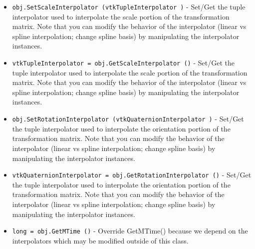\begin{itemize}
\item  \verb|obj.SetScaleInterpolator (vtkTupleInterpolator )| -  Set/Get the tuple interpolator used to interpolate the scale portion
 of the transformation matrix. Note that you can modify the behavior of
 the interpolator (linear vs spline interpolation; change spline basis)
 by manipulating the interpolator instances.

\item  \verb|vtkTupleInterpolator = obj.GetScaleInterpolator ()| -  Set/Get the tuple interpolator used to interpolate the scale portion
 of the transformation matrix. Note that you can modify the behavior of
 the interpolator (linear vs spline interpolation; change spline basis)
 by manipulating the interpolator instances.

\item  \verb|obj.SetRotationInterpolator (vtkQuaternionInterpolator )| -  Set/Get the tuple interpolator used to interpolate the orientation portion
 of the transformation matrix. Note that you can modify the behavior of
 the interpolator (linear vs spline interpolation; change spline basis)
 by manipulating the interpolator instances.

\item  \verb|vtkQuaternionInterpolator = obj.GetRotationInterpolator ()| -  Set/Get the tuple interpolator used to interpolate the orientation portion
 of the transformation matrix. Note that you can modify the behavior of
 the interpolator (linear vs spline interpolation; change spline basis)
 by manipulating the interpolator instances.

\item  \verb|long = obj.GetMTime ()| -  Override GetMTime() because we depend on the interpolators which may be
 modified outside of this class.

\end{itemize}
